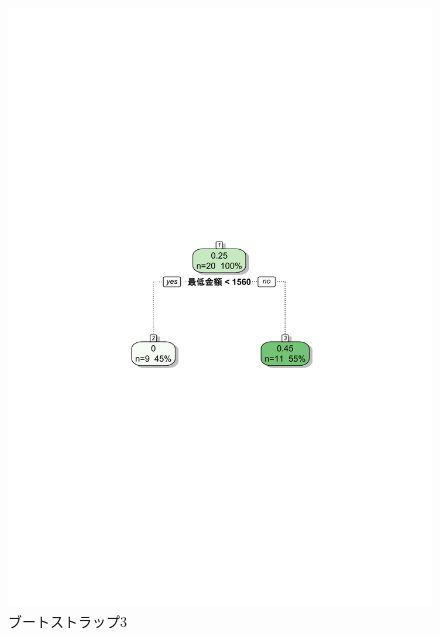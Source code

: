 \begin{figure}[H]
\centering
\includegraphics[width=13cm]{figure40.pdf}
\caption{ブートストラップ3}\label{sannp}
\end{figure}

